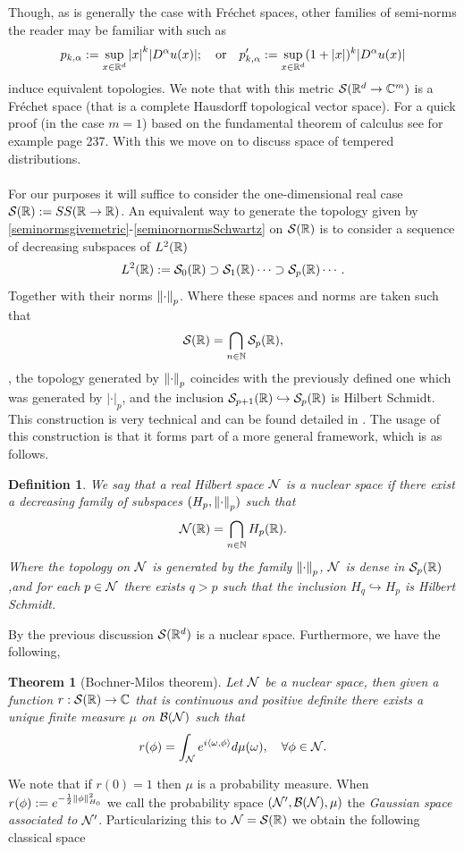 \documentclass[12pt]{article}
\newtheorem{theorem}{Theorem}
\newtheorem{definition}{Definition}
\newcommand{\br}[1]{\left\langle#1\right\rangle}
\begin{document}
Though, as is generally the case with Fréchet spaces, other families of semi-norms the reader may be familiar with such as
\[p_{k,\alpha}:=\sup_{x\in{\mathbb R}^d}\abs{x}^k \abs{D^\alpha u(x)};\quad\text{or}\quad p'_{k,\alpha}:=\sup_{x\in{\mathbb R}^d}(1+\abs{x})^k \abs{D^\alpha u(x)}\]
induce equivalent topologies. We note that with this metric ${\mathcal S}({\mathbb R}^d\to\mathbb{C}^m)$ is a Fréchet space (that is a complete Hausdorff topological vector space). For a quick proof (in the case $m=1$) based on the fundamental theorem of calculus see for example \cite{Foll} page 237.
\bigbreak With this we move on to discuss space of tempered distributions.\\
\\
For our purposes it will suffice to consider the one-dimensional real case ${\mathcal S}({\mathbb R}):=SS({\mathbb R}\to{\mathbb R})$. An equivalent way to generate the topology given by \eqref{seminormsgivemetric}-\eqref{seminornormsSchwartz} on ${\mathcal S}({\mathbb R})$ is to consider a sequence of decreasing  subspaces of $L^2({\mathbb R})$
\begin{equation*}
	L^2({\mathbb R}):={\mathcal S}_0({\mathbb R})\supset {\mathcal S}_1({\mathbb R})\cdots\supset {\mathcal S}_p({\mathbb R})\cdots.
\end{equation*}
Together with their norms $\norm{\cdot }_p$. Where these spaces and norms are taken such that
\begin{equation*}
	{\mathcal S}({\mathbb R})=\bigcap_{n \in \mathbb{N}}{\mathcal S}_p({\mathbb R}),
\end{equation*}
, the topology generated by $\norm{\cdot }_p$ coincides with the previously defined one which was generated by $|\cdot |_p$, and the inclusion ${\mathcal S}_{p+1}({\mathbb R})\hookrightarrow {\mathcal S}_p({\mathbb R})$ is Hilbert Schmidt. This construction is very technical and can be found detailed in \cite{becnel2004schwartz}. The usage of this construction is that it forms part of a more general framework, which is as follows.
\begin{definition}
	We say that a real Hilbert space $\mathcal{N}$ is a nuclear space if there exist a decreasing family of subspaces $(H_p,\norm{\cdot }_p)$ such that
	\begin{equation*}
		\mathcal{N}({\mathbb R})=\bigcap_{n \in \mathbb{N}}H_p({\mathbb R}).
	\end{equation*}
	Where the topology on $\mathcal{N}$ is generated by the family $\norm{\cdot }_p$, $\mathcal{N}$ is dense in ${\mathcal S}_p({\mathbb R})$,and for each $p \in \mathcal{N}$ there exists $q>p$ such that the inclusion  $H_q\hookrightarrow H_p$ is Hilbert Schmidt.
\end{definition}
By the previous discussion ${\mathcal S}({\mathbb R}^d)$ is a nuclear space. Furthermore, we have the following,
\begin{theorem}[Bochner-Milos theorem]
	Let $\mathcal{N}$ be a nuclear space, then given a function $r:{\mathcal S}({\mathbb R})\to\mathbb{C}$ that is continuous and positive definite there exists a unique finite measure $\mu $ on $\mathcal{B}(\mathcal{N})$ such that
	\begin{equation*}
		r(\phi)= \int_{\Nn} e^{i\br{\omega,\phi}}d \mu(\omega),\quad\forall \phi\in \Nn.
	\end{equation*}
\end{theorem}
We note that if $r(0)=1$ then  $\mu $ is a probability measure. When $r(\phi):=e^{-\frac{1}{2}\norm{\phi}_{H_0}^2}$ we call the probability space $(\mathcal{N}',\mathcal{B}(\mathcal{N}),\mu )$ the \emph{Gaussian space associated to $\mathcal{N}'$}. Particularizing this to $\mathcal{N}={\mathcal S}({\mathbb R})$ we obtain the following classical space
\end{document}
